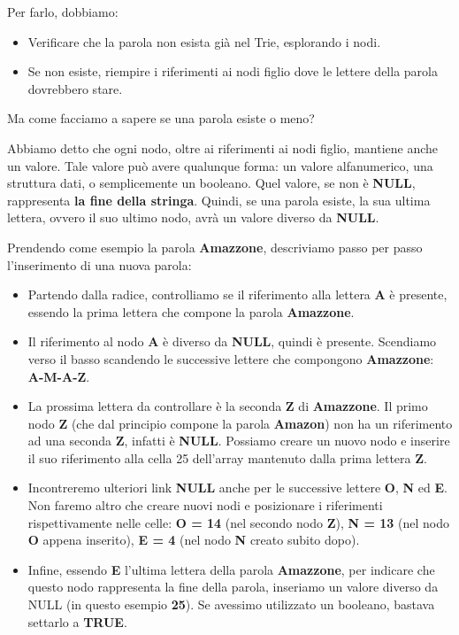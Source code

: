 \documentclass[a4paper, 12pt]{article}
\begin{document}
Per farlo, dobbiamo:
\begin{itemize}
    \item Verificare che la parola non esista già nel Trie, esplorando i nodi.
    \item Se non esiste, riempire i riferimenti ai nodi figlio dove le lettere della parola dovrebbero stare.
\end{itemize}

Ma come facciamo a sapere se una parola esiste o meno?

Abbiamo detto che ogni nodo, oltre ai riferimenti ai nodi figlio, mantiene anche un valore. Tale valore può avere qualunque forma: un valore alfanumerico, una struttura dati, o semplicemente un booleano. Quel valore, se non è \textbf{NULL}, rappresenta \textbf{la fine della stringa}. Quindi, se una parola esiste, la sua ultima lettera, ovvero il suo ultimo nodo, avrà un valore diverso da \textbf{NULL}.

Prendendo come esempio la parola \textbf{Amazzone}, descriviamo passo per passo l'inserimento di una nuova parola:

\begin{itemize}

    \item Partendo dalla radice, controlliamo se il riferimento alla lettera \textbf{A} è presente, essendo la prima lettera che compone la parola \textbf{Amazzone}.
    
    \item Il riferimento al nodo \textbf{A} è diverso da \textbf{NULL}, quindi è presente. Scendiamo verso il basso scandendo le successive lettere che compongono \textbf{Amazzone}: \textbf{A-M-A-Z}.
    
    \item La prossima lettera da controllare è la seconda \textbf{Z} di \textbf{Amazzone}. Il primo nodo \textbf{Z} (che dal principio compone la parola \textbf{Amazon}) non ha un riferimento ad una seconda \textbf{Z}, infatti è \textbf{NULL}. Possiamo creare un nuovo nodo e inserire il suo riferimento alla cella 25 dell'array mantenuto dalla prima lettera \textbf{Z}.
    
    \item Incontreremo ulteriori link \textbf{NULL} anche per le successive lettere \textbf{O}, \textbf{N} ed \textbf{E}. Non faremo altro che creare nuovi nodi e posizionare i riferimenti rispettivamente nelle celle: \textbf{O = 14} (nel secondo nodo \textbf{Z}), \textbf{N = 13} (nel nodo \textbf{O} appena inserito), \textbf{E = 4} (nel nodo \textbf{N} creato subito dopo).
    
    \item Infine, essendo \textbf{E} l'ultima lettera della parola \textbf{Amazzone}, per indicare che questo nodo rappresenta la fine della parola, inseriamo un valore diverso da NULL (in questo esempio \textbf{25}). Se avessimo utilizzato un booleano, bastava settarlo a \textbf{TRUE}.
    
\end{itemize}
\end{document}
